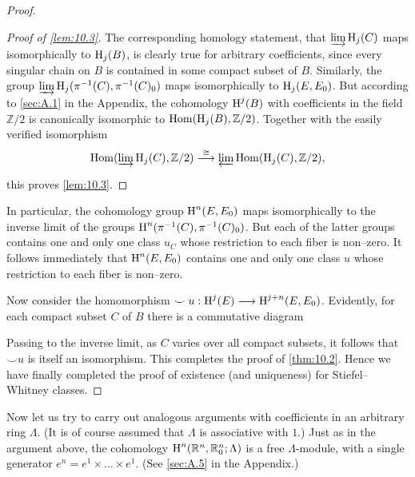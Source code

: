 \documentclass[../main]{subfiles}
\begin{document}
\begin{proof}
\begin{proof}[Proof of \ref{lem:10.3}]
The corresponding homology statement, that $\varinjlim \operatorname{H}_j(C)$ maps isomorphically to $\operatorname{H}_j(B)$, is clearly true for arbitrary coefficients, since every singular chain on $B$ is contained in some compact subset of $B$. Similarly, the group $\varinjlim \operatorname{H}_j(\pi^{-1}(C), \pi^{-1}(C)_0)$ maps isomorphically to $\operatorname{H}_j(E, E_0)$. But according to \ref{sec:A.1} in the Appendix, the cohomology $\operatorname{H}^j(B)$ with coefficients in the field $\mathbb Z/2$ is canonically isomorphic to $\operatorname{Hom}(\operatorname{H}_j(B), \mathbb Z/2)$. Together with the easily verified isomorphism \[\Hom(\varinjlim \homology_j(C), \mathbb Z/2) \varrightarrow{\cong} \varprojlim \Hom(\homology_j(C), \mathbb Z/2),\] this proves \ref{lem:10.3}. 
\end{proof}

In particular, the cohomology group $\operatorname{H}^n(E, E_0)$ maps isomorphically to the inverse limit of the groups $\operatorname{H}^n(\pi^{-1}(C), \pi^{-1}(C)_0)$. But each of the latter groups contains one and only one class $u_C$ whose restriction to each fiber is non--zero. It follows immediately that $\operatorname{H}^n(E, E_0)$ contains one and only one class $u$ whose restriction to each fiber is non--zero. 

Now consider the homomorphism $\smile u : \operatorname{H}^j(E) \longrightarrow \operatorname{H}^{j + n}(E, E_0)$. Evidently, for each compact subset $C$ of $B$ there is a commutative diagram
\begin{center}
\end{center}
Passing to the inverse limit, as $C$ varies over all compact subsets, it follows that $\smile u$ is itself an isomorphism. This completes the proof of \ref{thm:10.2}. Hence we have finally completed the proof of existence (and uniqueness) for Stiefel--Whitney classes.
\end{proof}

Now let us try to carry out analogous arguments with coefficients in an arbitrary ring $\Lambda$. (It is of course assumed that $\Lambda$ is associative with $1$.) Just as in the argument above, the cohomology $\operatorname{H}^n({\mathbb R}^n, {\mathbb R}^n_0; \Lambda)$ is a free $\Lambda$-module, with a single generator $e^n = e^1 \times \ldots \times e^1$. (See \ref{sec:A.5} in the Appendix.)
\end{document}
